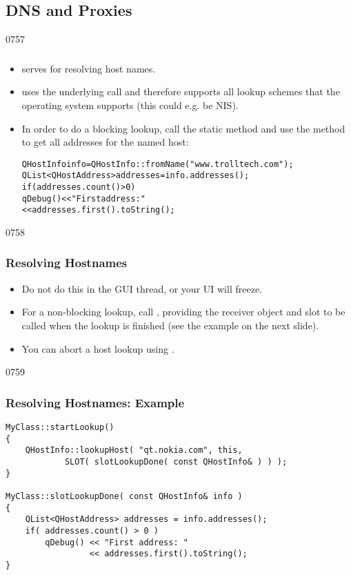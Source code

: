 \subsection{DNS and Proxies}
\begin{slide}[fragile]{0757}
\frametitle{}\label{QHostInfo}
  \begin{itemize}
    \item {} serves for resolving host names.
    \item {} uses the underlying
         call and therefore supports all
        lookup schemes that the operating system supports (this could
        e.g. be NIS).
    \item In order to do a blocking lookup, call the static method
         and use the
         method to get all addresses for the named
        host:
\begin{alltt}\small
QHostInfo info = QHostInfo::fromName( "www.trolltech.com" );
QList<QHostAddress> addresses = info.addresses();
if( addresses.count() > 0 )
  qDebug() << "First address: " 
           << addresses.first().toString();
\end{alltt}
  \end{itemize}
\end{slide}

\begin{slide}{0758}
\frametitle{Resolving Hostnames}
  \begin{itemize}
     \item Do not do this in the GUI thread, or your UI will
        freeze.
     \item For a non-blocking lookup, call
        , providing the receiver object and
        slot to be called when the lookup is finished (see the example
        on the next slide).
    \item You can abort a host lookup using .
  \end{itemize}
\end{slide}

\begin{slide}[fragile]{0759}
\frametitle{Resolving Hostnames: Example}
\begin{lstlisting}
MyClass::startLookup()
{
    QHostInfo::lookupHost( "qt.nokia.com", this,
            SLOT( slotLookupDone( const QHostInfo& ) ) );
}

MyClass::slotLookupDone( const QHostInfo& info )
{
    QList<QHostAddress> addresses = info.addresses();
    if( addresses.count() > 0 )
        qDebug() << "First address: "
                 << addresses.first().toString();
}
\end{lstlisting}
\end{slide}

